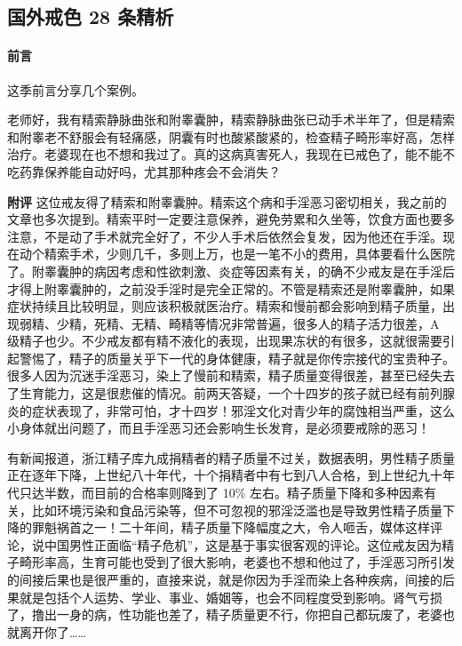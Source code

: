 \subsection{国外戒色 28 条精析}

\paragraph*{前言}

这季前言分享几个案例。

\begin{case}
    老师好，我有精索静脉曲张和附睾囊肿，精索静脉曲张已动手术半年了，但是精索和附睾老不舒服会有轻痛感，阴囊有时也酸紧酸紧的，检查精子畸形率好高，怎样治疗。老婆现在也不想和我过了。真的这病真害死人，我现在已戒色了，能不能不吃药靠保养能自动好吗，尤其那种疼会不会消失？

    \textbf{附评} 这位戒友得了精索和附睾囊肿。精索这个病和手淫恶习密切相关，我之前的文章也多次提到。精索平时一定要注意保养，避免劳累和久坐等，饮食方面也要多注意，不是动了手术就完全好了，不少人手术后依然会复发，因为他还在手淫。现在动个精索手术，少则几千，多则上万，也是一笔不小的费用，具体要看什么医院了。附睾囊肿的病因考虑和性欲刺激、炎症等因素有关，的确不少戒友是在手淫后才得上附睾囊肿的，之前没手淫时是完全正常的。不管是精索还是附睾囊肿，如果症状持续且比较明显，则应该积极就医治疗。精索和慢前都会影响到精子质量，出现弱精、少精，死精、无精、畸精等情况非常普遍，很多人的精子活力很差，A 级精子也少。不少戒友都有精不液化的表现，出现果冻状的有很多，这就很需要引起警惕了，精子的质量关乎下一代的身体健康，精子就是你传宗接代的宝贵种子。很多人因为沉迷手淫恶习，染上了慢前和精索，精子质量变得很差，甚至已经失去了生育能力，这是很悲催的情况。前两天答疑，一个十四岁的孩子就已经有前列腺炎的症状表现了，非常可怕，才十四岁！邪淫文化对青少年的腐蚀相当严重，这么小身体就出问题了，而且手淫恶习还会影响生长发育，是必须要戒除的恶习！

    有新闻报道，浙江精子库九成捐精者的精子质量不过关，数据表明，男性精子质量正在逐年下降，上世纪八十年代，十个捐精者中有七到八人合格，到上世纪九十年代只达半数，而目前的合格率则降到了 10\% 左右。精子质量下降和多种因素有关，比如环境污染和食品污染等，但不可忽视的邪淫泛滥也是导致男性精子质量下降的罪魁祸首之一！二十年间，精子质量下降幅度之大，令人咂舌，媒体这样评论，说中国男性正面临“精子危机”，这是基于事实很客观的评论。这位戒友因为精子畸形率高，生育可能也受到了很大影响，老婆也不想和他过了，手淫恶习所引发的间接后果也是很严重的，直接来说，就是你因为手淫而染上各种疾病，间接的后果就是包括个人运势、学业、事业、婚姻等，也会不同程度受到影响。肾气亏损了，撸出一身的病，性功能也差了，精子质量更不行，你把自己都玩废了，老婆也就离开你了……
\end{case}

